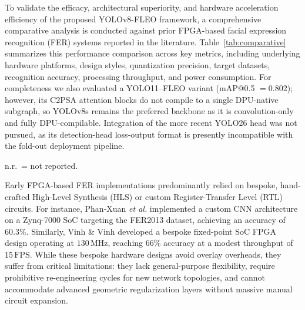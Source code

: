\documentclass[algorithms,article,submit,moreauthors]{Definitions/mdpi}
\newcommand{\rev}[1]{\textcolor{revcolor}{#1}}
\begin{document}
To validate the efficacy, architectural superiority, and hardware acceleration efficiency of the proposed YOLOv8-FLEO framework, a comprehensive comparative analysis is conducted against prior FPGA-based facial expression recognition (FER) systems reported in the literature. Table~\ref{tab:comparative} summarizes this performance comparison across key metrics, including underlying hardware platforms, design styles, quantization precision, target datasets, recognition accuracy, processing throughput, and power consumption. \rev{For completeness we also evaluated a YOLO11--FLEO variant (mAP@0.5 \mbox{$=0.802$}); however, its C2PSA attention blocks do not compile to a single DPU-native subgraph, so YOLOv8s remains the preferred backbone as it is convolution-only and fully DPU-compilable. Integration of the more recent YOLO26 head was not pursued, as its detection-head loss-output format is presently incompatible with the fold-out deployment pipeline.}

\begin{table}[h!]
\centering
\caption{Comparative Study with prior FPGA-based facial expression recognition systems.}
\label{tab:comparative}
\begin{tablenotes}[flushleft]\footnotesize
\item n.r.\ = not reported.
\end{tablenotes}
\end{table}

Early FPGA-based FER implementations predominantly relied on bespoke, hand-crafted High-Level Synthesis (HLS) or custom Register-Transfer Level (RTL) circuits. For instance, Phan-Xuan \textit{et al.}\citep{bib12} implemented a custom CNN architecture on a Zynq-7000 SoC targeting the FER2013 dataset, achieving an accuracy of $60.3\%$. Similarly, Vinh \& Vinh \citep{bib13} developed a bespoke fixed-point SoC FPGA design operating at $130\,\text{MHz}$, reaching $66\%$ accuracy at a modest throughput of $15\,\text{FPS}$. While these bespoke hardware designs avoid overlay overheads, they suffer from critical limitations: they lack general-purpose flexibility, require prohibitive re-engineering cycles for new network topologies, and cannot accommodate advanced geometric regularization layers without massive manual circuit expansion.
\end{document}
